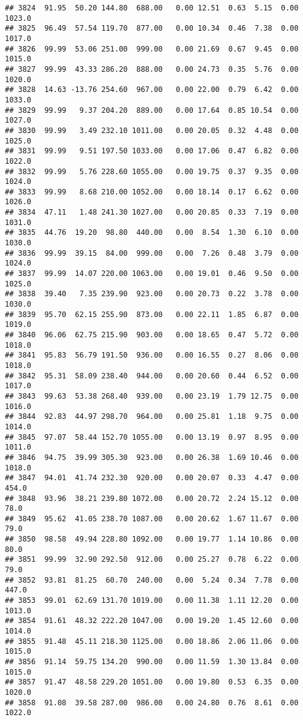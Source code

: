 \documentclass{article}\usepackage{graphicx, color}
\makeatletter
\newenvironment{kframe}{%
 \def\at@end@of@kframe{}%
 \ifinner\ifhmode%
  \def\at@end@of@kframe{\end{minipage}}%
  \begin{minipage}{\columnwidth}%
 \fi\fi%
 \def\FrameCommand##1{\hskip\@totalleftmargin \hskip-\fboxsep
 \colorbox{shadecolor}{##1}\hskip-\fboxsep
     \hskip-\linewidth \hskip-\@totalleftmargin \hskip\columnwidth}%
 \MakeFramed {\advance\hsize-\width
   \@totalleftmargin\z@ \linewidth\hsize
   \@setminipage}}%
 {\par\unskip\endMakeFramed%
 \at@end@of@kframe}
\newenvironment{knitrout}{}{} %
\makeatother
\begin{document}
\begin{knitrout}
\begin{kframe}
\begin{verbatim}
## 3824  91.95  50.20 144.80  688.00   0.00 12.51  0.63  5.15  0.00 1023.0
## 3825  96.49  57.54 119.70  877.00   0.00 10.34  0.46  7.38  0.00 1017.0
## 3826  99.99  53.06 251.00  999.00   0.00 21.69  0.67  9.45  0.00 1015.0
## 3827  99.99  43.33 286.20  888.00   0.00 24.73  0.35  5.76  0.00 1020.0
## 3828  14.63 -13.76 254.60  967.00   0.00 22.00  0.79  6.42  0.00 1033.0
## 3829  99.99   9.37 204.20  889.00   0.00 17.64  0.85 10.54  0.00 1027.0
## 3830  99.99   3.49 232.10 1011.00   0.00 20.05  0.32  4.48  0.00 1025.0
## 3831  99.99   9.51 197.50 1033.00   0.00 17.06  0.47  6.82  0.00 1022.0
## 3832  99.99   5.76 228.60 1055.00   0.00 19.75  0.37  9.35  0.00 1024.0
## 3833  99.99   8.68 210.00 1052.00   0.00 18.14  0.17  6.62  0.00 1026.0
## 3834  47.11   1.48 241.30 1027.00   0.00 20.85  0.33  7.19  0.00 1031.0
## 3835  44.76  19.20  98.80  440.00   0.00  8.54  1.30  6.10  0.00 1030.0
## 3836  99.99  39.15  84.00  999.00   0.00  7.26  0.48  3.79  0.00 1024.0
## 3837  99.99  14.07 220.00 1063.00   0.00 19.01  0.46  9.50  0.00 1025.0
## 3838  39.40   7.35 239.90  923.00   0.00 20.73  0.22  3.78  0.00 1030.0
## 3839  95.70  62.15 255.90  873.00   0.00 22.11  1.85  6.87  0.00 1019.0
## 3840  96.06  62.75 215.90  903.00   0.00 18.65  0.47  5.72  0.00 1018.0
## 3841  95.83  56.79 191.50  936.00   0.00 16.55  0.27  8.06  0.00 1018.0
## 3842  95.31  58.09 238.40  944.00   0.00 20.60  0.44  6.52  0.00 1017.0
## 3843  99.63  53.38 268.40  939.00   0.00 23.19  1.79 12.75  0.00 1016.0
## 3844  92.83  44.97 298.70  964.00   0.00 25.81  1.18  9.75  0.00 1014.0
## 3845  97.07  58.44 152.70 1055.00   0.00 13.19  0.97  8.95  0.00 1011.0
## 3846  94.75  39.99 305.30  923.00   0.00 26.38  1.69 10.46  0.00 1018.0
## 3847  94.01  41.74 232.30  920.00   0.00 20.07  0.33  4.47  0.00  454.0
## 3848  93.96  38.21 239.80 1072.00   0.00 20.72  2.24 15.12  0.00   78.0
## 3849  95.62  41.05 238.70 1087.00   0.00 20.62  1.67 11.67  0.00   79.0
## 3850  98.58  49.94 228.80 1092.00   0.00 19.77  1.14 10.86  0.00   80.0
## 3851  99.99  32.90 292.50  912.00   0.00 25.27  0.78  6.22  0.00   79.0
## 3852  93.81  81.25  60.70  240.00   0.00  5.24  0.34  7.78  0.00  447.0
## 3853  99.01  62.69 131.70 1019.00   0.00 11.38  1.11 12.20  0.00 1013.0
## 3854  91.61  48.32 222.20 1047.00   0.00 19.20  1.45 12.60  0.00 1014.0
## 3855  91.48  45.11 218.30 1125.00   0.00 18.86  2.06 11.06  0.00 1015.0
## 3856  91.14  59.75 134.20  990.00   0.00 11.59  1.30 13.84  0.00 1015.0
## 3857  91.47  48.58 229.20 1051.00   0.00 19.80  0.53  6.35  0.00 1020.0
## 3858  91.08  39.58 287.00  986.00   0.00 24.80  0.76  8.61  0.00 1022.0

\end{verbatim}
\end{kframe}
\end{knitrout}
\end{document}
